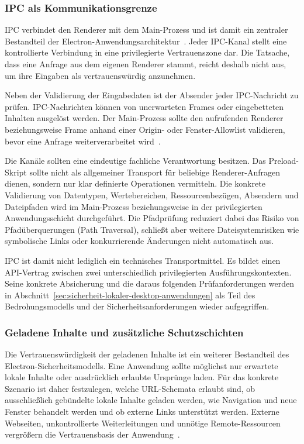 \subsubsection{IPC als Kommunikationsgrenze}
IPC verbindet den Renderer mit dem Main-Prozess und ist damit ein zentraler Bestandteil der Electron-Anwendungsarchitektur~\cite{electron2026ipc}.
Jeder IPC-Kanal stellt eine kontrollierte Verbindung in eine privilegierte Vertrauenszone dar.
Die Tatsache, dass eine Anfrage aus dem eigenen Renderer stammt, reicht deshalb nicht aus, um ihre Eingaben als vertrauenswürdig anzunehmen.

Neben der Validierung der Eingabedaten ist der Absender jeder IPC-Nachricht zu prüfen.
IPC-Nachrichten können von unerwarteten Frames oder eingebetteten Inhalten ausgelöst werden.
Der Main-Prozess sollte den aufrufenden Renderer beziehungsweise Frame anhand einer Origin- oder Fenster-Allowlist validieren, bevor eine Anfrage weiterverarbeitet wird~\cite{electron2026security}.

Die Kanäle sollten eine eindeutige fachliche Verantwortung besitzen.
Das Preload-Skript sollte nicht als allgemeiner Transport für beliebige Renderer-Anfragen dienen, sondern nur klar definierte Operationen vermitteln.
Die konkrete Validierung von Datentypen, Wertebereichen, Ressourcenbezügen, Absendern und Dateipfaden wird im Main-Prozess beziehungsweise in der privilegierten Anwendungsschicht durchgeführt.
Die Pfadprüfung reduziert dabei das Risiko von Pfadüberquerungen (Path Traversal), schließt aber weitere Dateisystemrisiken wie symbolische Links oder konkurrierende Änderungen nicht automatisch aus.

IPC ist damit nicht lediglich ein technisches Transportmittel.
Es bildet einen API-Vertrag zwischen zwei unterschiedlich privilegierten Ausführungskontexten.
Seine konkrete Absicherung und die daraus folgenden Prüfanforderungen werden in Abschnitt~\ref{sec:sicherheit-lokaler-desktop-anwendungen} als Teil des Bedrohungsmodells und der Sicherheitsanforderungen wieder aufgegriffen.

\subsubsection{Geladene Inhalte und zusätzliche Schutzschichten}
Die Vertrauenswürdigkeit der geladenen Inhalte ist ein weiterer Bestandteil des Electron-Sicherheitsmodells.
Eine Anwendung sollte möglichst nur erwartete lokale Inhalte oder ausdrücklich erlaubte Ursprünge laden.
Für das konkrete Szenario ist daher festzulegen, welche URL-Schemata erlaubt sind, ob ausschließlich gebündelte lokale Inhalte geladen werden, wie Navigation und neue Fenster behandelt werden und ob externe Links unterstützt werden.
Externe Webseiten, unkontrollierte Weiterleitungen und unnötige Remote-Ressourcen vergrößern die Vertrauensbasis der Anwendung~\cite{electron2026security}.

